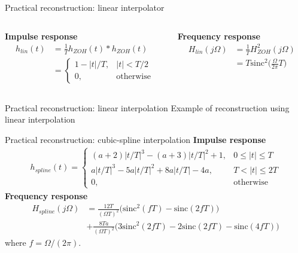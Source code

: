 \documentclass[10pt, aspectratio=169]{beamer}
\begin{document}
\begin{frame}{Practical reconstruction: linear interpolator}
	\begin{columns}[t]
		\begin{column}{0.5\textwidth}
			\textbf{Impulse response}
			\begin{align*}
			h_{lin}(t) &= \frac{1}{T}h_{ZOH}(t)\ast h_{ZOH}(t) \\
			&= \begin{cases}
			1-|t|/T, & |t| < T/2 \\
			0, & \text{otherwise}
			\end{cases} 
			\end{align*}
		\end{column}
		\begin{column}{0.5\textwidth}
			\textbf{Frequency response}
			\begin{align*}
			H_{lin}(j\Omega) &= \frac{1}{T}H^2_{ZOH}(j\Omega) \\
			&= T\mathrm{sinc}^2\Big(\frac{\Omega}{2\pi} T\Big)
			\end{align*}
		\end{column}
	\end{columns}
	\begin{center}
		\resizebox{0.75\linewidth}{!}{}
	\end{center}
\end{frame}

\begin{frame}{Practical reconstruction: linear interpolation}
	Example of reconstruction using linear interpolation
	\begin{center}
		\resizebox{0.7\linewidth}{!}{}
	\end{center}
\end{frame}

\begin{frame}{Practical reconstruction: cubic-spline interpolation}
\textbf{Impulse response}
\begin{align*}
	h_{spline}(t) = \begin{cases}
	(a+2)|t/T|^3 - (a+3)|t/T|^2 + 1, & 0 \leq |t| \leq T \\
	a|t/T|^3 - 5a|t/T|^2 + 8a|t/T|-4a, & T < |t| \leq 2T \\
	0, & \text{otherwise}
	\end{cases} 
\end{align*}
\textbf{Frequency response}
\begin{align*}
	H_{spline}(j\Omega) &= \frac{12T}{(\Omega T)^2}\Big(\mathrm{sinc}^2(fT)-\mathrm{sinc}(2fT)\Big) \\
	&+ \frac{8Ta}{(\Omega T)^2}\Big(3\mathrm{sinc}^2(2fT) - 2\mathrm{sinc}(2fT) - \mathrm{sinc}(4fT)\Big)
\end{align*}
where $f = \Omega/(2\pi)$.
\end{frame}
\end{document}
